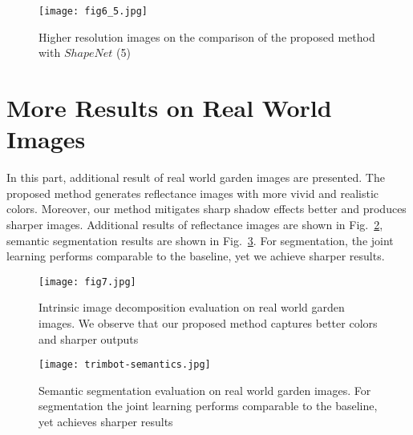 \documentclass[runningheads]{llncs}
\begin{document}
\begin{figure}[h]
    \centering
    \texttt{[image: fig6\_5.jpg]}
    \caption{Higher resolution images on the comparison of the proposed method with $ShapeNet$ (5)}
    \label{fig:25}
\end{figure}


\section{More Results on Real World Images}
In this part, additional result of real world garden images are presented. The proposed method generates reflectance images with more vivid and realistic colors. Moreover, our method mitigates sharp shadow effects better and produces sharper images. Additional results of reflectance images are shown in Fig.~\ref{fig:3}, semantic segmentation results are shown in Fig.~\ref{fig:33}. For segmentation, the joint learning performs comparable to the baseline, yet we achieve sharper results.

\begin{figure}[h]
    \centering
    \texttt{[image: fig7.jpg]}
    \caption{Intrinsic image decomposition evaluation on real world garden images. We observe that our proposed method captures better colors and sharper outputs}
    \label{fig:3}
\end{figure}


\begin{figure}[h]
    \centering
    \texttt{[image: trimbot-semantics.jpg]}
    \caption{Semantic segmentation evaluation on real world garden images. For segmentation the joint learning performs comparable to the baseline, yet achieves sharper results}
    \label{fig:33}
\end{figure}

\clearpage

\end{document}
